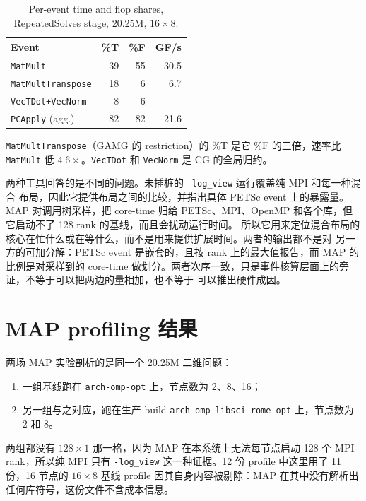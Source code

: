\documentclass[11pt,a4paper,oneside]{report}
\begin{document}
\begin{table}[htbp]
  \centering
  \caption{Per-event time and flop shares, RepeatedSolves stage, 20.25M, $16\times8$.}
  \label{tab:tf}
  \begin{tabular}{lrrr}
    \toprule
    Event & \%T & \%F & GF/s \\
    \midrule
    \texttt{MatMult}          & 39 & 55 & 30.5 \\
    \texttt{MatMultTranspose} & 18 &  6 &  6.7 \\
    \texttt{VecTDot+VecNorm}  &  8 &  6 & --   \\
    \texttt{PCApply} (agg.)   & 82 & 82 & 21.6 \\
    \bottomrule
  \end{tabular}
\end{table}

\texttt{MatMultTranspose}（GAMG 的 restriction）的 \%T 是它 \%F 的三倍，速率比
\texttt{MatMult} 低 $4.6\times$。\texttt{VecTDot} 和 \texttt{VecNorm} 是 CG 的全局归约。

两种工具回答的是不同的问题。未插桩的 \texttt{-log\_view} 运行覆盖纯 MPI 和每一种混合
布局，因此它提供布局之间的比较，并指出具体 PETSc event 上的暴露量。MAP 对调用树采样，把
core-time 归给 PETSc、MPI、OpenMP 和各个库，但它启动不了 128 rank 的基线，而且会扰动运行时间。
所以它用来定位混合布局的核心在忙什么或在等什么，而不是用来提供扩展时间。两者的输出都不是对
另一方的可加分解：PETSc event 是嵌套的，且按 rank 上的最大值报告，而 MAP 的比例是对采样到的
core-time 做划分。两者次序一致，只是事件核算层面上的旁证，不等于可以把两边的量相加，也不等于
可以推出硬件成因。

\section{MAP profiling 结果}
\label{sec:map-matrix}
两场 MAP 实验剖析的是同一个 20.25M 二维问题：

\begin{enumerate}
  \item 一组基线跑在 \texttt{arch-omp-opt} 上，节点数为 2、8、16；
  \item 另一组与之对应，跑在生产 build \texttt{arch-omp-libsci-rome-opt} 上，节点数为 2 和 8。
\end{enumerate}

两组都没有 $128\times1$ 那一格，因为 MAP 在本系统上无法每节点启动 128 个 MPI rank，所以纯 MPI
只有 \texttt{-log\_view} 这一种证据。12 份 profile 中这里用了 11 份，16 节点的 $16\times8$ 基线
profile 因其自身内容被剔除：MAP 在其中没有解析出任何库符号，这份文件不含成本信息。
\end{document}
